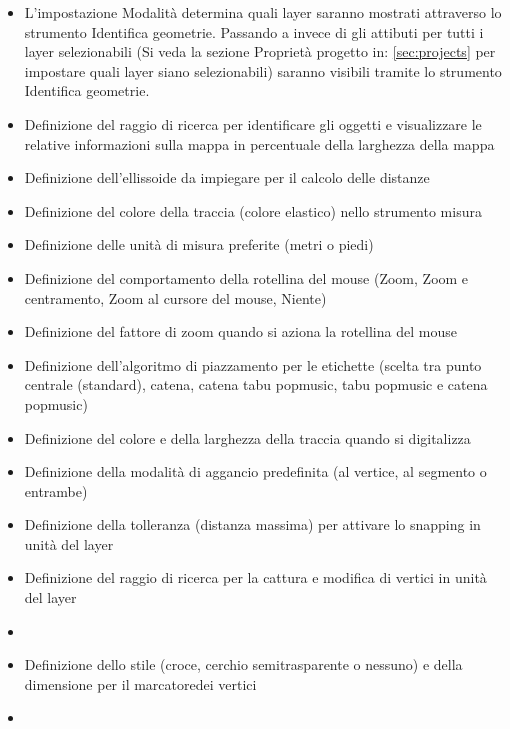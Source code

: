 
\begin{itemize}
\item L'impostazione Modalità determina quali layer saranno mostrati attraverso
lo strumento Identifica geometrie. Passando a  invece di 
 gli attibuti per tutti i layer selezionabili
(Si veda la sezione Proprietà progetto in: \ref{sec:projects} per impostare quali
layer siano selezionabili) saranno visibili tramite lo strumento Identifica geometrie.
\item Definizione del raggio di ricerca per identificare gli oggetti e
visualizzare le relative informazioni sulla mappa in percentuale della
larghezza della mappa
\item Definizione dell'ellissoide da impiegare per il calcolo delle distanze
\item Definizione del colore della traccia (colore elastico) nello strumento
misura
\item Definizione delle unità di misura preferite (metri o piedi)
\item Definizione del comportamento della rotellina del mouse (Zoom, Zoom e
centramento, Zoom al cursore del mouse, Niente)
\item Definizione del fattore di zoom quando si aziona la rotellina del mouse
\end{itemize}


\begin{itemize}
\item Definizione dell'algoritmo di piazzamento per le etichette (scelta tra punto centrale
(standard), catena, catena tabu popmusic, tabu popmusic e catena popmusic)
\end{itemize}


\begin{itemize}
\item Definizione del colore e della larghezza della traccia quando si digitalizza
\item Definizione della modalità di aggancio predefinita (al vertice, al
segmento o entrambe)
\item Definizione della tolleranza (distanza massima) per attivare lo snapping
in unità del layer
\item Definizione del raggio di ricerca per la cattura e modifica di vertici
in unità del layer
\item {}
\item Definizione dello stile (croce, cerchio semitrasparente o nessuno) e della
dimensione per il marcatoredei vertici 
\item {}
\end{itemize}

